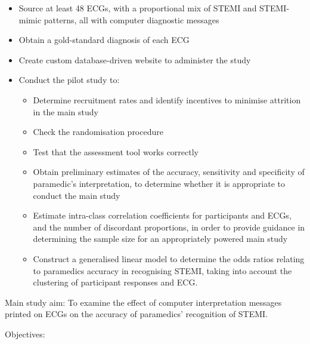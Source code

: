 \begin{itemize}
\item Source at least 48 ECGs, with a proportional mix of STEMI and STEMI-mimic patterns, all with computer diagnostic messages

\item Obtain a gold-standard diagnosis of each ECG

\item Create custom database-driven website to administer the study

\item Conduct the pilot study to:

\begin{itemize}
\item Determine recruitment rates and identify incentives to minimise attrition in the main study

\item Check the randomisation procedure

\item Test that the assessment tool works correctly

\item Obtain preliminary estimates of the accuracy, sensitivity and specificity of paramedic's interpretation, to determine whether it is appropriate to conduct the main study

\item Estimate intra-class correlation coefficients for participants and ECGs, and the number of discordant proportions, in order to provide guidance in determining the sample size for an appropriately powered main study

\item Construct a generalised linear model to determine the odds ratios relating to paramedics accuracy in recognising STEMI, taking into account the clustering of participant responses and ECG.

\end{itemize}

\end{itemize}

Main study aim: To examine the effect of computer interpretation messages printed on ECGs on the accuracy of paramedics’ recognition of STEMI.

Objectives:

